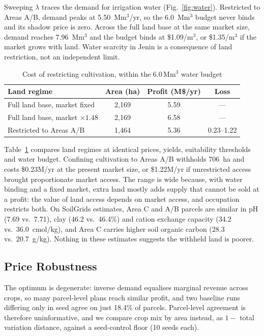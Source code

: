 \documentclass[conference,a4paper]{IEEEtran}
\begin{document}
Sweeping $\lambda$ traces the demand for irrigation water
(Fig.~\ref{fig:water}). Restricted to Areas A/B, demand peaks at
5.50~Mm$^3$/yr, so the 6.0~Mm$^3$ budget never binds and its shadow price is
zero. Across the full land base at the same market size, demand reaches
7.96~Mm$^3$ and the budget binds at \$1.09/m$^3$, or \$1.35/m$^3$ if the
market grows with land. Water scarcity in Jenin is a consequence of land
restriction, not an independent limit.

\begin{table}[t]
\centering
\caption{Cost of restricting cultivation, within the 6.0\,Mm$^3$ water budget}
\label{tab:areac}
\footnotesize
\setlength{\tabcolsep}{4pt}
\begin{tabular}{lccc}
\toprule
Land regime & Area (ha) & Profit (M\$/yr) & Loss \\
\midrule
Full land base, market fixed & 2{,}169 & 5.59 & --- \\
Full land base, market $\times1.48$ & 2{,}169 & 6.58 & --- \\
Restricted to Areas A/B & 1{,}464 & 5.36 & 0.23--1.22 \\
\bottomrule
\end{tabular}
\end{table}

Table~\ref{tab:areac} compares land regimes at identical prices, yields,
suitability thresholds and water budget. Confining cultivation to Areas A/B
withholds 706~ha and costs \$0.23M/yr at the present market size, or
\$1.22M/yr if unrestricted access brought proportionate market access. The
range is wide because, with water binding and a fixed market, extra land
mostly adds supply that cannot be sold at a profit: the value of land access
depends on market access, and occupation restricts both. On SoilGrids
estimates, Area C and A/B parcels are similar in pH (7.69 vs.\ 7.71), clay
(46.2 vs.\ 46.4\%) and cation exchange capacity (34.2 vs.\ 36.0~cmol/kg), and
Area C carries higher soil organic carbon (28.3 vs.\ 20.7~g/kg). Nothing in
these estimates suggests the withheld land is poorer.

\subsection{Price Robustness}

The optimum is degenerate: inverse demand equalises marginal revenue across
crops, so many parcel-level plans reach similar profit, and two baseline runs
differing only in seed agree on just 18.4\% of parcels. Parcel-level agreement
is therefore uninformative, and we compare crop mix by area instead, as
$1-$ total variation distance, against a seed-control floor (10 seeds each).
\end{document}

